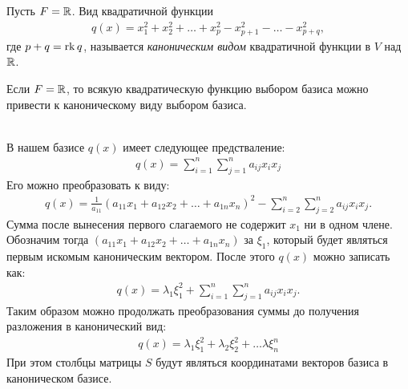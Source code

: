 \begin{definition}
    Пусть $F = \mathbb{R}$. Вид квадратичной функции
    \begin{align*}
        q(x) = x_1^2 + x_2^2 + \dots + x_p^2 - x_{p+1}^2 - \dots - x_{p+q}^2,
    \end{align*} 
    где $p + q = \operatorname{rk} q$, называется \textit{каноническим видом} квадратичной функции в $V$ над $\mathbb{R}$.
\end{definition}

\begin{corollary}
    Если $F = \mathbb{R}$, то всякую квадратическую функцию выбором базиса можно привести к каноническому виду 
    выбором базиса.
\end{corollary}

\begin{algorithm}~\\
    В нашем базисе $q(x)$ имеет следующее предстваление:
    \begin{gather*}
        q(x) = \sum_{i=1}^{n}\sum_{j=1}^{n} a_{ij}x_i x_j
    \end{gather*}
    Его можно преобразовать к виду: 
    \begin{gather*}
        q(x) = \frac{1}{a_{11}} (a_{11} x_1 + a_{12} x_2 + \dots + a_{1n} x_n)^2 - 
        \sum_{i=2}^{n}\sum_{j=2}^{n} a_{ij}x_i x_j.
    \end{gather*}
    Сумма после вынесения первого слагаемого не содержит $x_1$ ни в одном члене. Обозначим тогда 
    $(a_{11} x_1 + a_{12} x_2 + \dots + a_{1n} x_n)$ за $\xi_1$, который будет являться первым 
    искомым каноническим вектором. После этого $q(x)$ можно записать как:
    \begin{gather*}
        q(x) = \lambda_1  \xi_1^2 + \sum_{i=1}^{n}\sum_{j=1}^{n} a_{ij}x_i x_j.
    \end{gather*}
    Таким образом можно продолжать преобразования суммы до получения разложения в канонический вид:
    \begin{gather*}
        q(x) = \lambda_1  \xi_1^2 + \lambda_2 \xi_2^2 + \dots \lambda \xi_n^n
    \end{gather*}
    При этом столбцы матрицы $S$ будут являться координатами векторов базиса в каноническом базисе.
\end{algorithm}
